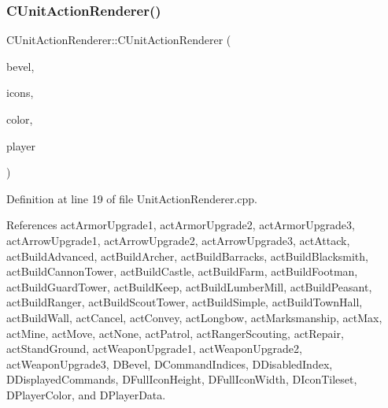 \subsubsection{\texorpdfstring{C\+Unit\+Action\+Renderer()}{CUnitActionRenderer()}}
{\footnotesize\ttfamily C\+Unit\+Action\+Renderer\+::\+C\+Unit\+Action\+Renderer (\begin{DoxyParamCaption}\item[{std\+::shared\+\_\+ptr$<$ \hyperlink{classCBevel}{C\+Bevel} $>$}]{bevel,  }\item[{std\+::shared\+\_\+ptr$<$ \hyperlink{classCGraphicTileset}{C\+Graphic\+Tileset} $>$}]{icons,  }\item[{\hyperlink{GameDataTypes_8h_aafb0ca75933357ff28a6d7efbdd7602f}{E\+Player\+Color}}]{color,  }\item[{std\+::shared\+\_\+ptr$<$ \hyperlink{classCPlayerData}{C\+Player\+Data} $>$}]{player }\end{DoxyParamCaption})}



Definition at line 19 of file Unit\+Action\+Renderer.\+cpp.



References act\+Armor\+Upgrade1, act\+Armor\+Upgrade2, act\+Armor\+Upgrade3, act\+Arrow\+Upgrade1, act\+Arrow\+Upgrade2, act\+Arrow\+Upgrade3, act\+Attack, act\+Build\+Advanced, act\+Build\+Archer, act\+Build\+Barracks, act\+Build\+Blacksmith, act\+Build\+Cannon\+Tower, act\+Build\+Castle, act\+Build\+Farm, act\+Build\+Footman, act\+Build\+Guard\+Tower, act\+Build\+Keep, act\+Build\+Lumber\+Mill, act\+Build\+Peasant, act\+Build\+Ranger, act\+Build\+Scout\+Tower, act\+Build\+Simple, act\+Build\+Town\+Hall, act\+Build\+Wall, act\+Cancel, act\+Convey, act\+Longbow, act\+Marksmanship, act\+Max, act\+Mine, act\+Move, act\+None, act\+Patrol, act\+Ranger\+Scouting, act\+Repair, act\+Stand\+Ground, act\+Weapon\+Upgrade1, act\+Weapon\+Upgrade2, act\+Weapon\+Upgrade3, D\+Bevel, D\+Command\+Indices, D\+Disabled\+Index, D\+Displayed\+Commands, D\+Full\+Icon\+Height, D\+Full\+Icon\+Width, D\+Icon\+Tileset, D\+Player\+Color, and D\+Player\+Data.


